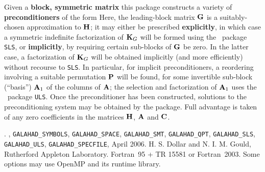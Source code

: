 \documentclass{galahad}
\newcommand{\packagename}{SBLS}
\newcommand{\fullpackagename}{\libraryname\_\packagename}
\begin{document}
\galheader


\galsummary
Given a {\bf block, symmetric matrix}
this package constructs a variety of {\bf preconditioners} of the form
Here, the leading-block matrix ${\mathbf{G}}$ is a suitably-chosen
approximation to ${\mathbf{H}}$; it may either be prescribed {\bf explicitly}, in
which case a symmetric indefinite factorization of ${\mathbf{K}}_{G}$
will be formed using the \galahad\ package {\tt SLS},
or {\bf implicitly}, by requiring certain sub-blocks of ${\mathbf{G}}$
be zero. In the latter case, a factorization of ${\mathbf{K}}_{G}$ will be
obtained implicitly (and more efficiently) without recourse to {\tt SLS}.
In particular, for implicit preconditioners, a reordering
involving a suitable permutation ${\mathbf{P}}$ will be found, for some
invertible sub-block (``basis'') ${\mathbf{A}}_1$ of the columns of ${\mathbf{A}}$;
the selection and factorization of ${\mathbf{A}}_1$ uses
the \galahad\ package {\tt ULS}.
Once the preconditioner has been constructed,
solutions to the preconditioning system
may be obtained by the package.
Full advantage is taken of any zero coefficients in the matrices ${\mathbf{H}}$,
${\mathbf{A}}$ and ${\mathbf{C}}$.


\galattributes
\galversions{\tt  \fullpackagename\_single, \fullpackagename\_double}.
,
{\tt GALAHAD\_\-SY\-M\-BOLS},
{\tt GALAHAD\-\_SPACE},
{\tt GALAHAD\_SMT},
{\tt GALAHAD\_QPT},
{\tt GALAHAD\_SLS},
{\tt GALAHAD\_ULS},
{\tt GALAHAD\_SPECFILE},
\galdate April 2006.
\galorigin H. S. Dollar and N. I. M. Gould,
Rutherford Appleton Laboratory.
\gallanguage Fortran~95 + TR 15581 or Fortran~2003.
\galparallelism Some options may use OpenMP and its runtime library.

\end{document}
